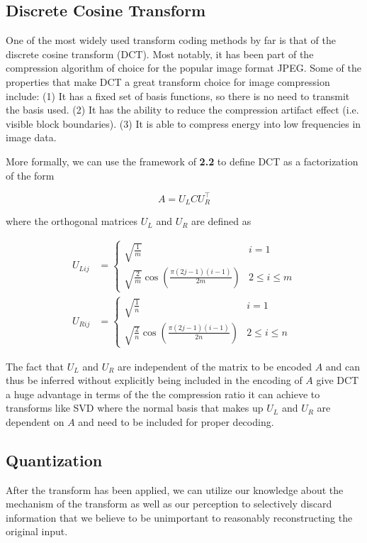 \documentclass[review,onefignum,onetabnum]{siamart190516}
\begin{document}
\subsection{Discrete Cosine Transform}
One of the most widely used transform coding methods by far is that of the discrete
cosine transform (DCT). Most notably, it has been part of the compression algorithm
of choice for the popular image format JPEG. Some of the properties that make DCT
a great transform choice for image compression include: (1) It has a fixed set of
basis functions, so there is no need to transmit the basis used. (2) It has the 
ability to reduce the compression artifact effect (i.e. visible block boundaries).
(3) It is able to compress energy into low frequencies in image data. \cite{reininger1983distributions}
\cite{ahmed1974discrete}

More formally, we can use the framework of \textbf{2.2} to define DCT as a 
factorization of the form

\[
  A = U_L C U_R^\top
\]

where the orthogonal matrices $U_L$ and $U_R$ are defined as 

\begin{align*}
  U_{Lij} &= \begin{cases}
    \sqrt{\frac{1}{m}} & i = 1 \\
    \sqrt{\frac{2}{m}} \cos(\frac{\pi (2j - 1)(i - 1)}{2m}) & 2 \leq i \leq m
  \end{cases} \\
  U_{Rij} &= \begin{cases}
    \sqrt{\frac{1}{n}} & i = 1 \\
    \sqrt{\frac{2}{n}} \cos(\frac{\pi (2j - 1)(i - 1)}{2n}) & 2 \leq i \leq n
  \end{cases}
\end{align*}

The fact that $U_L$ and $U_R$ are independent of the matrix to be encoded $A$ and
can thus be inferred without explicitly being included in the encoding of $A$
give DCT a huge advantage in terms of the the compression ratio it can achieve
to transforms like SVD where the normal basis that makes up $U_L$ and $U_R$ are
dependent on $A$ and need to be included for proper decoding.

\subsection{Quantization}
After the transform has been applied, we can utilize our knowledge about the mechanism
of the transform as well as our perception to selectively discard information that
we believe to be unimportant to reasonably reconstructing the original input. 
\end{document}

